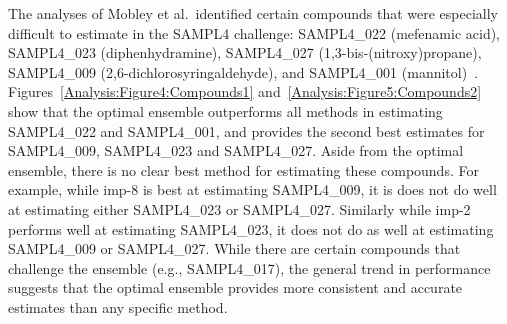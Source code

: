 \documentclass[journal=jpcbfk, manuscript=article]{achemso}
\newcommand{\+}[1]{\ensuremath{\mathbf{#1}}}
\begin{document}
The analyses of Mobley et al.~identified certain compounds that were especially difficult to estimate in the SAMPL4 challenge: SAMPL4\_022 (mefenamic acid), SAMPL4\_023 (diphenhydramine), SAMPL4\_027 (1,3-bis-(nitroxy)propane), SAMPL4\_009 (2,6-dichlorosyringaldehyde), and SAMPL4\_001 (mannitol)~\cite{Mobley:2014}.
Figures~\ref{Analysis:Figure4:Compounds1} and~\ref{Analysis:Figure5:Compounds2} show that the optimal ensemble outperforms all methods in estimating SAMPL4\_022 and SAMPL4\_001, and provides the second best estimates for SAMPL4\_009, SAMPL4\_023 and SAMPL4\_027.
Aside from the optimal ensemble, there is no clear best method for estimating these compounds.
For example, while imp-8 is best at estimating SAMPL4\_009, it is does not do well at estimating either SAMPL4\_023 or SAMPL4\_027.
Similarly while imp-2 performs well at estimating SAMPL4\_023, it does not do as well at estimating SAMPL4\_009 or SAMPL4\_027.
While there are certain compounds that challenge the ensemble (e.g., SAMPL4\_017), the general trend in performance suggests that the optimal ensemble provides more consistent and accurate estimates than any specific method. 
\end{document}
